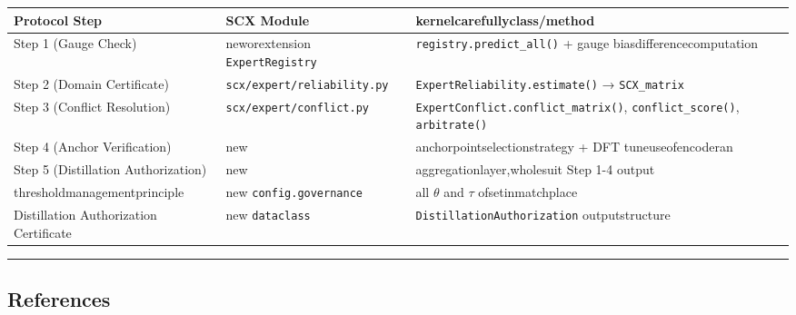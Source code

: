 \documentclass[
  12pt,
]{article}
\begin{document}
\begin{longtable}[]{@{}
  >{\centering\arraybackslash}p{}
  >{\raggedright\arraybackslash}p{}
  >{\raggedright\arraybackslash}p{}@{}}
\toprule\noalign{}
\begin{minipage}[b]{\linewidth}\centering
Protocol Step
\end{minipage} & \begin{minipage}[b]{\linewidth}\raggedright
SCX Module
\end{minipage} & \begin{minipage}[b]{\linewidth}\raggedright
kernelcarefullyclass/method
\end{minipage} \\
\midrule\noalign{}
\endhead
\bottomrule\noalign{}
\endlastfoot
Step 1 (Gauge Check) & neworextension \texttt{ExpertRegistry} &
\texttt{registry.predict\_all()} + gauge biasdifferencecomputation \\
Step 2 (Domain Certificate) & \texttt{scx/expert/reliability.py} &
\texttt{ExpertReliability.estimate()} → \texttt{SCX\_matrix} \\
Step 3 (Conflict Resolution) & \texttt{scx/expert/conflict.py} &
\texttt{ExpertConflict.conflict\_matrix()}, \texttt{conflict\_score()},
\texttt{arbitrate()} \\
Step 4 (Anchor Verification) & new & anchorpointselectionstrategy + DFT tuneuseofencoderan \\
Step 5 (Distillation Authorization) & new & aggregationlayer,wholesuit Step 1-4
output \\
thresholdmanagementprinciple & new \texttt{config.governance} & all \(\theta\) and \(\tau\)
ofsetinmatchplace \\
Distillation Authorization Certificate & new \texttt{dataclass} &
\texttt{DistillationAuthorization} outputstructure \\
\end{longtable}

\begin{center}\rule{0.5\linewidth}{0.5pt}\end{center}

\subsection{References}\label{ux53c2ux8003ux6587ux732e}
\end{document}
